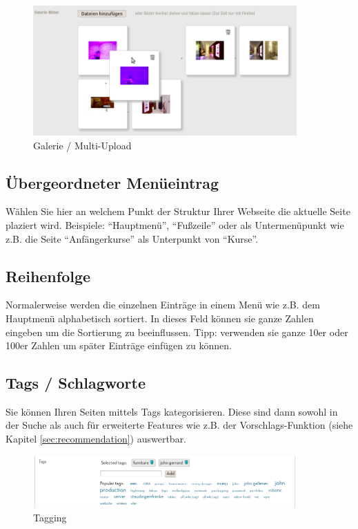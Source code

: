 \documentclass[article, a4paper, oneside, 11pt]{memoir}
\begin{document}
\begin{figure}[htp]
\centering
\includegraphics[width=0.9\textwidth]{gallery}
\caption{Galerie / Multi-Upload}
\label{fig:gallery}
\end{figure}






\subsection{Übergeordneter Menüeintrag}

Wählen Sie hier an welchem Punkt der Struktur Ihrer Webseite die aktuelle Seite plaziert wird. Beispiele: "`Hauptmenü"', "`Fußzeile"' oder als Untermenüpunkt wie z.B. die Seite "`Anfängerkurse"' als Unterpunkt von "`Kurse"'.

\subsection{Reihenfolge}

Normalerweise werden die einzelnen Einträge in einem Menü wie z.B. dem Hauptmenü alphabetisch sortiert. In dieses Feld können sie ganze Zahlen eingeben um die Sortierung zu beeinflussen. Tipp: verwenden sie ganze 10er oder 100er Zahlen um später Einträge einfügen zu können. 

\subsection{Tags / Schlagworte}
\label{sec:tagging}

Sie können Ihren Seiten mittels Tags kategorisieren. Diese sind dann sowohl in der Suche als auch für erweiterte Features wie z.B. der Vorschlags-Funktion (siehe Kapitel \vref{sec:recommendation}) auswertbar.

\begin{figure}[htp]
\centering
\includegraphics[width=0.9\textwidth]{tagging}
\caption{Tagging}
\label{fig:tagging}
\end{figure}
\end{document}
